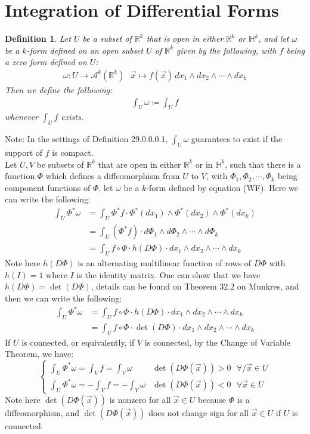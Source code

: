 \documentclass[11pt,oneside]{book}
\theoremstyle{break}
\theoremstyle{break}
\newtheorem{defn}{Definition}[corL]
\newcommand{\R}{\mathbb{R}}
\newcommand{\A}{\mathcal{A}}
\newcommand{\note}{\color{red}Note: \color{black}}
\begin{document}
\newpage
\section[Integration of Differential Forms]{\color{red} Integration of Differential Forms \color{black}}
\begin{defn}
Let $U$ be a subset of $\R^k$ that is open in either $\R^k$ or $\mathbb{H}^k$, and let $\omega$ be a $k$-form defined on an open subset $U$ of $\R^k$ given by the following, with $f$ being a zero form defined on $U$:
\begin{align*}
\omega:U \to \A^k(\R^k) \ \ \ \vec{x}\mapsto  f(\vec{x}) \,dx_1 \wedge dx_2 \wedge \cdots \wedge dx_k \tag{WF}
\end{align*}
Then we define the following:
\begin{align*}
\int_U \omega \coloneqq \int_U f
\end{align*}
whenever $\int_U f$ exists.
\end{defn}
\note In the settings of Definition 29.0.0.0.1, $\int_U \omega$ guarantees to exist if the support of $f$ is compact.\\

Let $U,V$ be subsets of $\R^k$ that are open in either $\R^k$ or in $\mathbb{H}^k$, such that there is a function $\Phi$ which defines a diffeomorphism from $U$ to $V$, with $\Phi_1, \Phi_2,\cdots, \Phi_k$ being component functions of $\Phi$, let $\omega$ be a $k$-form defined by equation (WF). Here we can write the following:
\begin{align*}
\int_U \Phi^*\omega &= \int_U \Phi^*f \cdot \Phi^*(dx_1)\wedge \Phi^*(dx_2)\wedge \Phi^*(dx_k)\\
&= \int_U (\Phi^* f) \cdot d\Phi_1 \wedge d\Phi_2 \wedge \cdots\wedge d\Phi_k \\
&= \int_U f\circ \Phi \cdot h(D\Phi) \cdot dx_1\wedge dx_2 \wedge \cdots \wedge dx_k
\end{align*}
Note here $h(D\Phi)$ is an alternating multilinear function of rows of $D\Phi$ with $h(I) = 1$ where $I$ is the identity matrix. One can show that we have $h(D\Phi) = \det(D\Phi)$, details can be found on Theorem 32.2 on Munkres, and then we can write the following:
\begin{align*}
\int_U \Phi^*\omega &= \int_U f\circ \Phi \cdot h(D\Phi) \cdot dx_1\wedge dx_2 \wedge \cdots \wedge dx_k\\
&= \int_U f\circ \Phi \cdot \det(D\Phi) \cdot dx_1\wedge dx_2 \wedge \cdots \wedge dx_k
\end{align*}
If $U$ is connected, or equivalently, if $V$ is connected, by the Change of Variable Theorem, we have:
$$\begin{cases}\int_U \Phi^*\omega =  \int_V f = \int_V \omega &  \det(D\Phi(\vec{x}))>0\ \ \ \forall/ \vec{x}\in U \\ \int_U \Phi^*\omega = - \int_V f = -\int_V \omega & \det(D\Phi(\vec{x}))<0\ \ \ \forall \vec{x}\in U \end{cases}$$ 
Note here $\det(D\Phi(\vec{x}))$ is nonzero for all $\vec{x}\in U$ because $\Phi$ is a diffeomorphism, and  $\det(D\Phi(\vec{x}))$ does not change sign for all $\vec{x}\in U$ if $U$ is connected. \\
\end{document}
